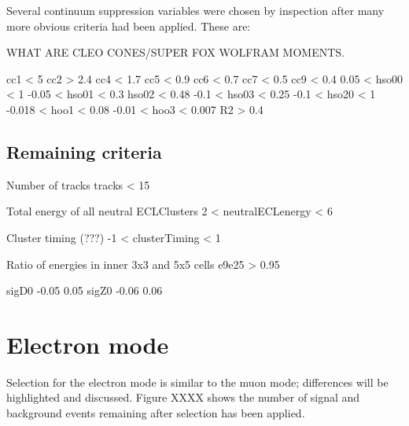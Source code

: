 \documentclass[12pt]{thesis}  %
\begin{document}
Several continuum suppression variables were chosen by inspection after many more obvious criteria had been applied. These are:

WHAT ARE CLEO CONES/SUPER FOX WOLFRAM MOMENTS.

cc1 < 5
cc2 > 2.4
cc4 < 1.7
cc5 < 0.9
cc6 < 0.7
cc7 < 0.5
cc9 < 0.4
0.05 < hso00 < 1
-0.05 < hso01 < 0.3
hso02 < 0.48
-0.1 < hso03 < 0.25
-0.1 < hso20 < 1
-0.018 < hoo1 < 0.08
-0.01 < hoo3 < 0.007
R2 > 0.4


\subsection{Remaining criteria}


Number of tracks 
tracks < 15

Total energy of all neutral ECLClusters
2 < neutralECLenergy < 6


Cluster timing (???)
-1 < clusterTiming < 1


Ratio of energies in inner 3x3 and 5x5 cells
e9e25 > 0.95

sigD0	-0.05	0.05
sigZ0	-0.06	0.06

\section{Electron mode}

Selection for the electron mode is similar to the muon mode; differences will be highlighted and discussed. Figure XXXX shows the number of signal and background events remaining after selection has been applied.
\end{document}
